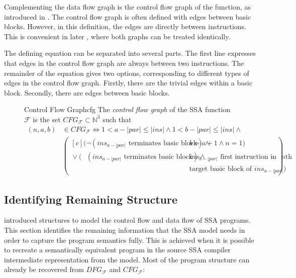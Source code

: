     Complementing the data flow graph is the control flow graph of the function,
    as introduced in .
    The control flow graph is often defined with edges between basic blocks.
    However, in this definition, the edges are directly between instructions.
    This is convenient in later
    , where both graphs
    can be treated identically.

    The defining equation can be separated into several parts.
    The first line expresses that edges in the control flow graph are always
    between two instructions.
    The remainder of the equation gives two options, corresponding to different
    types of edges in the control flow graph.
    Firstly, there are the trivial edges within a basic block.
    Secondly, there are edges between basic blocks.


\begin{figure}[h]
\begin{definition}{Control Flow Graph}{cfg}
    The {\em control flow graph} of the SSA function $\mathcal F$ is the set
    $CFG_{\mathcal F}\subset \mathbb N^3$ such that
    \begin{align*}
        (n,a,b)&{}\in CFG_{\mathcal F}\iff 1<a-|par|\leq|ins|\mathrel{\land}1<b-|par|\leq|ins|\mathrel{\land}\\
               &\left(\begin{aligned}[c]
                                    (\neg (ins_{a-|par|}\text{ terminates basic block})\mathrel{\land}{}&b=a+1\mathrel{\land}n=1)\\
                      \mathrel{\lor}(\phantom{\neg}(ins_{a-|par|}\text{ terminates basic block})\mathrel{\land}{}&ins_{b-|par|}\text{ first instruction in}\text{ $n$th}\\[-0.5em]
                                                   &\text{target basic block of }ins_{a-|par|})
        \end{aligned}\right).
    \end{align*}
\end{definition}
\end{figure}

\subsection{Identifying Remaining Structure}
\label{sec:remainingstructure}

     introduced structures to model the control flow
    and data flow of SSA programs.
    This section identifies the remaining information that the SSA model needs
    in order to capture the program semantics fully.
    This is achieved when it is possible to recreate a semantically equivalent
    program in the source SSA compiler intermediate representation from the
    model.
    Most of the program structure can already be recovered from $DFG_\mathcal F$
    and $CFG_\mathcal F$:

